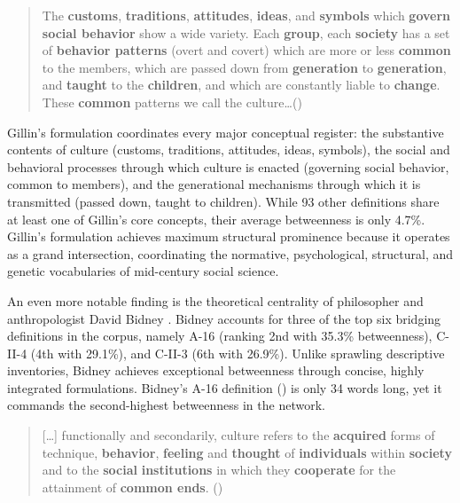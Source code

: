 \documentclass[11pt]{article}
\begin{document}
\begin{quotation}
The \textbf{customs}, \textbf{traditions}, \textbf{attitudes}, \textbf{ideas}, and \textbf{symbols} which \textbf{govern} \textbf{social behavior} show a wide variety. Each \textbf{group}, each \textbf{society} has a set of \textbf{behavior patterns} (overt and covert) which are more or less \textbf{common} to the members, which are passed down from \textbf{generation} to \textbf{generation}, and \textbf{taught} to the \textbf{children}, and which are constantly liable to \textbf{change}. These \textbf{common} patterns we call the culture\ldots (\citealt{gillin1942})
\end{quotation}

Gillin's formulation coordinates every major conceptual register: the substantive contents of culture (customs, traditions, attitudes, ideas, symbols), the social and behavioral processes through which culture is enacted (governing social behavior, common to members), and the generational mechanisms through which it is transmitted (passed down, taught to children). While 93 other definitions share at least one of Gillin's core concepts, their average betweenness is only 4.7\%. Gillin's formulation achieves maximum structural prominence because it operates as a grand intersection, coordinating the normative, psychological, structural, and genetic vocabularies of mid-century social science.

An even more notable finding is the theoretical centrality of philosopher and anthropologist David Bidney \citeyearpar{bidney1968theoretical-29d}. Bidney accounts for three of the top six bridging definitions in the corpus, namely A-16 (ranking 2nd with 35.3\% betweenness), C-II-4 (4th with 29.1\%), and C-II-3 (6th with 26.9\%). Unlike sprawling descriptive inventories, Bidney achieves exceptional betweenness through concise, highly integrated formulations. Bidney's A-16 definition (\citealt{bidney1947}) is only 34 words long, yet it commands the second-highest betweenness in the network.

\begin{quotation}
[\ldots] functionally and secondarily, culture refers to the \textbf{acquired} forms of technique, \textbf{behavior}, \textbf{feeling} and \textbf{thought} of \textbf{individuals} within \textbf{society} and to the \textbf{social} \textbf{institutions} in which they \textbf{cooperate} for the attainment of \textbf{common ends}. (\citealt{bidney1947})
\end{quotation}
\end{document}

